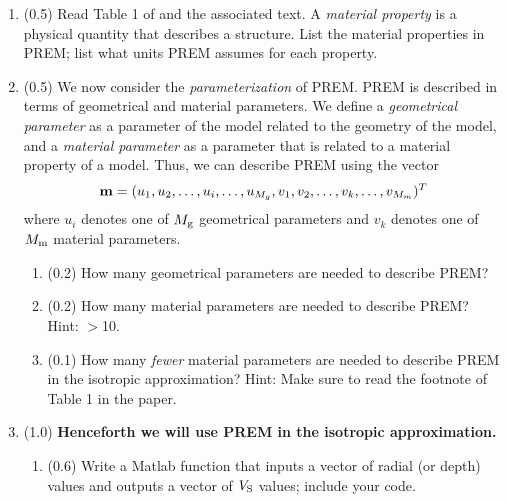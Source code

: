 \documentclass[11pt,titlepage,fleqn]{article}
\begin{document}
\begin{enumerate}

\item (0.5) Read Table 1 of \citet{PREM} and the associated text. A {\em material property} is a physical quantity that describes a structure. List the material properties in PREM; list what units PREM assumes for each property.


\item (0.5) We now consider the {\em parameterization} of PREM. PREM is described in terms of geometrical and material parameters. We define a {\em geometrical parameter} as a parameter of the model related to the geometry of the model, and a {\em material parameter} as a parameter that is related to a material property of a model. Thus, we can describe PREM using the vector
%
\begin{equation}
\mbox{${\bf m}$} = (u_1, u_2, \ldots, u_i, \ldots, u_{M_g}, v_1, v_2, \ldots, v_k, \ldots, v_{M_m})^T
\end{equation}
%
where $u_i$ denotes one of $M_{\rm g}$ geometrical parameters and $v_k$ denotes one of $M_{\rm m}$ material parameters.

\begin{enumerate}
\item (0.2) How many geometrical parameters are needed to describe PREM?
\item (0.2) How many material parameters are needed to describe PREM? Hint: $>$10.
\item (0.1) How many {\em fewer} material parameters are needed to describe PREM in the isotropic approximation? Hint: Make sure to read the footnote of Table 1 in the paper.
\end{enumerate}



\item (1.0) {\bf Henceforth we will use PREM in the isotropic approximation.}


\begin{enumerate}
\item (0.6) Write a Matlab function that inputs a vector of radial (or depth) values and outputs a vector of $V_{\rm S}$ values; include your code.


\end{enumerate}
\end{enumerate}
\end{document}
